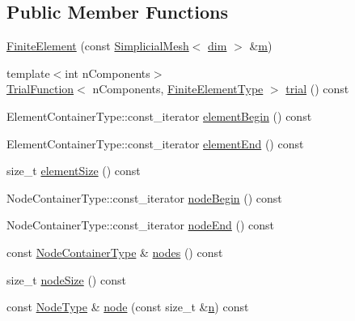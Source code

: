 \subsection*{Public Member Functions}
\begin{DoxyCompactItemize}
\item 
\hyperlink{classmodel_1_1_finite_element_aabb4aad6a63713e872537c7543495e41}{Finite\+Element} (const \hyperlink{classmodel_1_1_simplicial_mesh}{Simplicial\+Mesh}$<$ \hyperlink{classmodel_1_1_finite_element_a818c65bf8f508c121f1990d430c2b0c0}{dim} $>$ \&\hyperlink{_longest_processing_time_8m_aa45df908642118b77cda186b3250197c}{m})
\item 
{\footnotesize template$<$int n\+Components$>$ }\\\hyperlink{classmodel_1_1_trial_function}{Trial\+Function}$<$ n\+Components, \hyperlink{classmodel_1_1_finite_element_a52dc23d4d24a1a38ff0f90d5708c02a8}{Finite\+Element\+Type} $>$ \hyperlink{classmodel_1_1_finite_element_a2b401c2c10451499bbb7ec768a73f2ab}{trial} () const 
\item 
Element\+Container\+Type\+::const\+\_\+iterator \hyperlink{classmodel_1_1_finite_element_a4b434a15ecb68f357be08037a2660d0f}{element\+Begin} () const 
\item 
Element\+Container\+Type\+::const\+\_\+iterator \hyperlink{classmodel_1_1_finite_element_a70acd545e94f2e69242e9a531316129d}{element\+End} () const 
\item 
size\+\_\+t \hyperlink{classmodel_1_1_finite_element_a2bd02c9dd0db05f2c2e0cffe52df7ab3}{element\+Size} () const 
\item 
Node\+Container\+Type\+::const\+\_\+iterator \hyperlink{classmodel_1_1_finite_element_a9e85a4542305e2e8a9f4cc5968d79f5d}{node\+Begin} () const 
\item 
Node\+Container\+Type\+::const\+\_\+iterator \hyperlink{classmodel_1_1_finite_element_a56843739f759fb7b89b09b2bf455c6e3}{node\+End} () const 
\item 
const \hyperlink{classmodel_1_1_finite_element_ac66ce55971f21abdbdea01dd7f391c70}{Node\+Container\+Type} \& \hyperlink{classmodel_1_1_finite_element_a3b9949feb89f7c77f944abedd9ea82d1}{nodes} () const 
\item 
size\+\_\+t \hyperlink{classmodel_1_1_finite_element_af8f4a9900c538752e189d8df2ccd2594}{node\+Size} () const 
\item 
const \hyperlink{classmodel_1_1_finite_element_a050ffcafad7f62787f006bae60b7c7be}{Node\+Type} \& \hyperlink{classmodel_1_1_finite_element_a67ae4b69b021c9625d61ee3f63ac1c2f}{node} (const size\+\_\+t \&\hyperlink{_f_e_m_2linear__elasticity__3d_2tetgen_2generate_p_o_l_ycube_8m_a74637fc31d6aedd6d61cdc0c8154bc13}{n}) const 

\end{DoxyCompactItemize}
